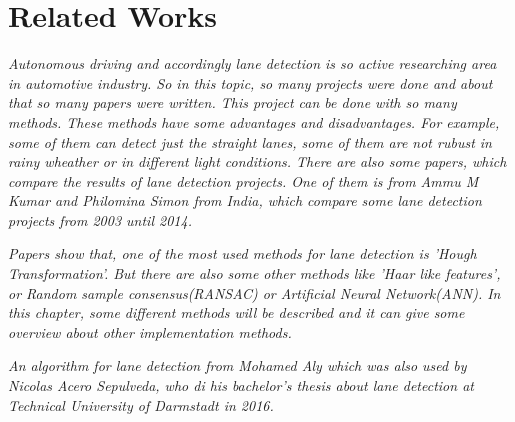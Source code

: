 %
\chapter{Related Works}\label{cha:Related Works}

\emph{\color{blue}Autonomous driving and accordingly lane detection is so active researching area in automotive industry. So in this topic, so many projects were done and about that so many papers were written. This project can be done with so many methods. These methods have some advantages and disadvantages. For example, some of them can detect just the straight lanes, some of them are not rubust in rainy wheather or in different light conditions. There are also some papers, which compare the results of lane detection projects. One of them is from Ammu M Kumar and Philomina Simon from India, which compare some lane detection projects from 2003 until 2014. }\cite{Review_of_Lane_Detection}
 
\emph{\color{blue}Papers show that, one of the most used methods for lane detection is 'Hough Transformation'. But there are also some other methods like 'Haar like features', or Random sample consensus(RANSAC) or Artificial Neural Network(ANN). In this chapter, some different methods will be described and it can give some overview about other implementation methods.} 

\emph{\color{blue} An algorithm for lane detection from Mohamed Aly which was also used by Nicolas Acero Sepulveda, who di his bachelor's thesis about lane detection at Technical University of Darmstadt in 2016.\cite{Bachelorthesis_Nicolas}} 

